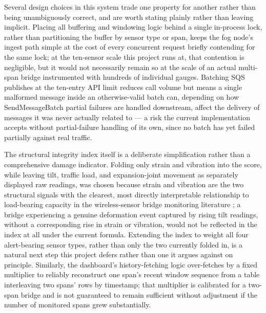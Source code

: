 \documentclass[conference]{IEEEtran}
\begin{document}
Several design choices in this system trade one property for another rather than being unambiguously correct, and are worth stating plainly rather than leaving implicit. Placing all buffering and windowing logic behind a single in-process lock, rather than partitioning the buffer by sensor type or span, keeps the fog node's ingest path simple at the cost of every concurrent request briefly contending for the same lock; at the ten-sensor scale this project runs at, that contention is negligible, but it would not necessarily remain so at the scale of an actual multi-span bridge instrumented with hundreds of individual gauges. Batching SQS publishes at the ten-entry API limit reduces call volume but means a single malformed message inside an otherwise-valid batch can, depending on how SendMessageBatch partial failures are handled downstream, affect the delivery of messages it was never actually related to --- a risk the current implementation accepts without partial-failure handling of its own, since no batch has yet failed partially against real traffic.

The structural integrity index itself is a deliberate simplification rather than a comprehensive damage indicator. Folding only strain and vibration into the score, while leaving tilt, traffic load, and expansion-joint movement as separately displayed raw readings, was chosen because strain and vibration are the two structural signals with the clearest, most directly interpretable relationship to load-bearing capacity in the wireless-sensor bridge monitoring literature \cite{ref6}; a bridge experiencing a genuine deformation event captured by rising tilt readings, without a corresponding rise in strain or vibration, would not be reflected in the index at all under the current formula. Extending the index to weight all four alert-bearing sensor types, rather than only the two currently folded in, is a natural next step this project defers rather than one it argues against on principle. Similarly, the dashboard's history-fetching logic over-fetches by a fixed multiplier to reliably reconstruct one span's recent window sequence from a table interleaving two spans' rows by timestamp; that multiplier is calibrated for a two-span bridge and is not guaranteed to remain sufficient without adjustment if the number of monitored spans grew substantially.
\end{document}
